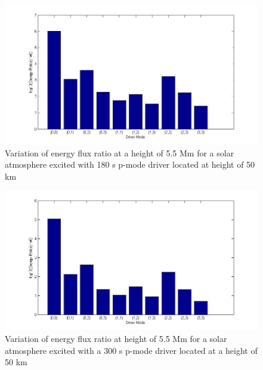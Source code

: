 \documentclass[authoryear,final,1p]{elsarticle}
\begin{document}
\begin{figure}[h]
\includegraphics[scale=0.5]{imagesn/ratio_varoverdrve_eflux_vperiod_forallmodes_180s_5p5Mm.jpg}
\caption{Variation of energy flux ratio at a height of 5.5 Mm for a solar atmosphere excited with 180 s p-mode driver located 
at height of 50 km}
\label{Fig18}
\end{figure}

\begin{figure}[h]
\includegraphics[scale=0.5]{imagesn/ratio_varoverdrve_eflux_vperiod_forallmodes_300s_5p5Mm.jpg}
\caption{Variation of energy flux ratio at height of 5.5 Mm for a solar atmosphere excited with a 300 s p-mode driver 
located at a height of 50 km}
\label{Fig19}
\end{figure}
\end{document}
